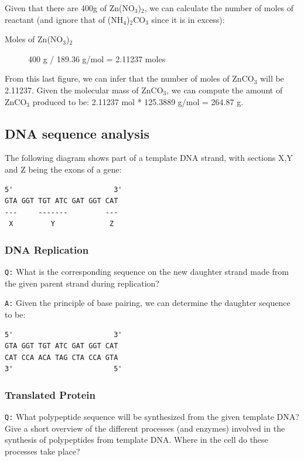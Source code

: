 \documentclass[11pt, a4paper,titlepage]{article}
\begin{document}
Given that there are 400g of Zn(NO$_{3}$)$_{2}$, we can calculate the
number of moles of reactant (and ignore that of (NH$_{4}$)$_{2}$CO$_{3}$
since it is in excess):

\begin{description}
\item[Moles of Zn(NO$_{3}$)$_{2}$] 400 g / 189.36 g/mol = 2.11237 moles
\end{description}

From this last figure, we can infer that the number of moles of
ZnCO$_{3}$ will be 2.11237. Given the molecular mass of ZnCO$_{3}$, we can
compute the amount of ZnCO$_{3}$ produced to be: 2.11237 mol * 125.3889
g/mol = 264.87 g.
\subsection{DNA sequence analysis}
\label{sec-1-2}


The following diagram shows part of a template DNA strand, with
sections X,Y and Z being the exons of a gene:


\begin{verbatim}
5'                        3'
GTA GGT TGT ATC GAT GGT CAT
---     -------         ---
 X         Y             Z
\end{verbatim}
\subsubsection{DNA Replication}
\label{sec-1-2-1}

\texttt{Q:} What is the corresponding sequence on the new daughter strand
made from the given parent strand during replication?

\texttt{A:} Given the principle of base pairing, we can determine the daughter
sequence to be:


\begin{verbatim}
5'                        3'
GTA GGT TGT ATC GAT GGT CAT
CAT CCA ACA TAG CTA CCA GTA
3'                        5'
\end{verbatim}
\subsubsection{Translated Protein}
\label{sec-1-2-2}

\texttt{Q:} What polypeptide sequence will be synthesized from the given template
DNA? Give a short overview of the different processes (and enzymes)
involved in the synthesis of polypeptides from template DNA. Where in
the cell do these processes take place?
\end{document}

